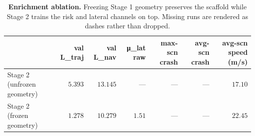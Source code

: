 \begin{table}[t]
\centering
\caption{\textbf{Enrichment ablation.} Freezing Stage 1 geometry preserves the scaffold while Stage 2 trains the risk and lateral channels on top. Missing runs are rendered as dashes rather than dropped.}
\label{tab:enrichment_ablation}
\small
\begin{tabular}{lrrrrrr}
\toprule
 & val L_traj & val L_nav & μ_lat raw & max-scn crash & avg-scn crash & avg-scn speed (m/s) \\
\midrule
Stage 2 (unfrozen geometry) & $5.393$ & $13.145$ & --- & --- & --- & $17.10$ \\
Stage 2 (frozen geometry) & $1.278$ & $10.279$ & $1.51$ & --- & --- & $22.45$ \\
\bottomrule
\end{tabular}
\end{table}
